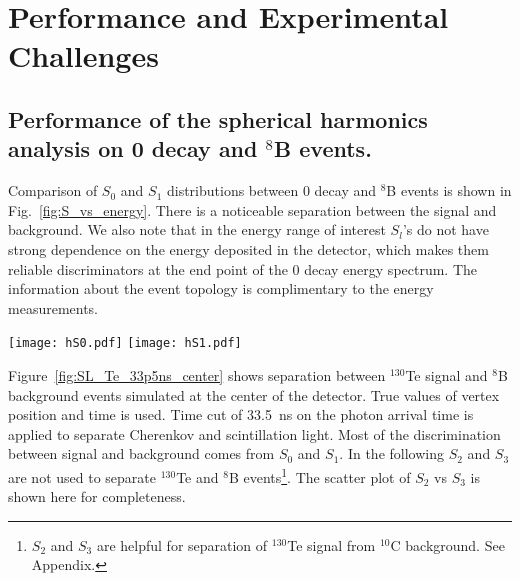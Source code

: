 \section{Performance and Experimental Challenges}
\label{sec:performance_and_challenges}

\subsection{Performance of the spherical harmonics analysis on 0{\nbb} decay and $^{8}$B events.}

Comparison of $S_0$ and $S_1$ distributions between 0{\nbb} decay and
$^{8}$B events is shown in Fig.~\ref{fig:S_vs_energy}. There is a
noticeable separation between the signal and background. We also note
that in the energy range of interest $S_l$'s do not have strong
dependence on the energy deposited in the detector, which makes them
reliable discriminators at the end point of the 0{\nbb} decay energy
spectrum. The information about the event topology is complimentary to
the energy measurements.

\begin{figure*}[h]
\centering
\texttt{[image: hS0.pdf]}
\texttt{[image: hS1.pdf]}
\caption{$S_0$ (\emph{left}) and $S_1$ (\emph{right}) distributions
  for events with two different event topologies and total kinetic
  energy. $^{130}$Te, $^{82}$Se 0{\nbb} decay, 2.529 MeV and 2.995 MeV
  events are compared. The simulation is done for events with the
  vertex in the center of the detector. $^{8}$B events are implemented
  as 2.529~MeV or 2.995~MeV electrons with initial direction along
  $x$-axis. Perfect vertex reconstruction - true vertex position is
  used. Time cut of 33.5~ns on the photon arrival time is applied.}
\label{fig:S_vs_energy}
\end{figure*}

Figure~\ref{fig:SL_Te_33p5ns_center} shows separation between
$^{130}$Te signal and $^{8}$B background events simulated at the
center of the detector. True values of vertex position and time is
used. Time cut of 33.5~ns on the photon arrival time is applied to
separate Cherenkov and scintillation light. Most of the discrimination
between signal and background comes from $S_0$ and $S_1$. In the
following $S_2$ and $S_3$ are not used to separate $^{130}$Te and
$^{8}$B events\footnote{$S_2$ and $S_3$ are helpful for separation of
  $^{130}$Te signal from $^{10}$C background. See Appendix.}. The
scatter plot of $S_2$ vs $S_3$ is shown here for completeness.

